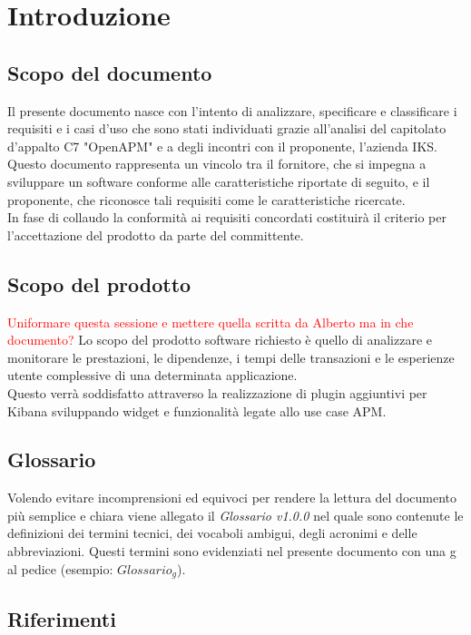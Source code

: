\section{Introduzione}
	\subsection{Scopo del documento}
	Il presente documento nasce con l'intento di analizzare, specificare e classificare i requisiti e i casi d'uso che sono stati individuati grazie all'analisi del capitolato d'appalto C7 "OpenAPM" e a degli incontri con il proponente, l'azienda IKS.\\
	Questo documento rappresenta un vincolo tra il fornitore, che si impegna a sviluppare un software conforme alle caratteristiche riportate di seguito, e il proponente, che riconosce tali requisiti come le caratteristiche ricercate.\\
	In fase di collaudo la conformità ai requisiti concordati costituirà il criterio per l'accettazione del prodotto da parte del committente.

	\subsection{Scopo del prodotto}
	\textcolor{red}{Uniformare questa sessione e mettere quella scritta da Alberto ma in che documento?}
	Lo scopo del prodotto software richiesto è quello di analizzare e monitorare le prestazioni, le dipendenze, i tempi delle transazioni e le esperienze utente complessive di una determinata applicazione.\\
	Questo verrà soddisfatto attraverso la realizzazione di plugin aggiuntivi per Kibana sviluppando widget e funzionalità legate allo use case APM.
	\subsection{Glossario}
		Volendo evitare incomprensioni  ed equivoci per rendere la lettura del documento più semplice e chiara viene allegato il \emph{Glossario v1.0.0} nel quale sono contenute le definizioni dei termini tecnici, dei vocaboli ambigui, degli acronimi e delle abbreviazioni. Questi termini sono evidenziati nel presente documento con una g al pedice (esempio: $Glossario_{g}$).
	\subsection{Riferimenti}

